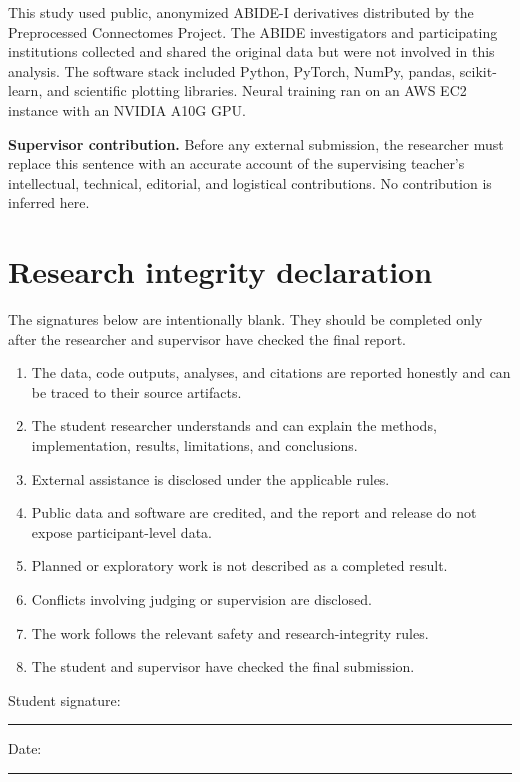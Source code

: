 \documentclass[11pt,a4paper]{article}
\begin{document}
This study used public, anonymized ABIDE-I derivatives distributed by the
Preprocessed Connectomes Project. The ABIDE investigators and participating
institutions collected and shared the original data but were not involved in
this analysis. The software stack included Python, PyTorch, NumPy, pandas,
scikit-learn, and scientific plotting libraries. Neural training ran on an AWS
EC2 instance with an NVIDIA A10G GPU.

\noindent\textbf{Supervisor contribution.} Before any external submission,
the researcher must replace this sentence with an accurate account of the
supervising teacher's intellectual, technical, editorial, and logistical
contributions. No contribution is inferred here.

\section*{Research integrity declaration}

The signatures below are intentionally blank. They should be completed only
after the researcher and supervisor have checked the final report.

\begin{enumerate}[label=\arabic*.,leftmargin=2.2em]
  \item The data, code outputs, analyses, and citations are reported honestly
  and can be traced to their source artifacts.
  \item The student researcher understands and can explain the methods,
  implementation, results, limitations, and conclusions.
  \item External assistance is disclosed under the applicable rules.
  \item Public data and software are credited, and the report and release do
  not expose participant-level data.
  \item Planned or exploratory work is not described as a completed result.
  \item Conflicts involving judging or supervision are disclosed.
  \item The work follows the relevant safety and research-integrity rules.
  \item The student and supervisor have checked the final submission.
\end{enumerate}

\vspace{1.2cm}
\noindent Student signature: \rule{7.2cm}{0.4pt}\hfill Date: \rule{3.0cm}{0.4pt}
\end{document}
